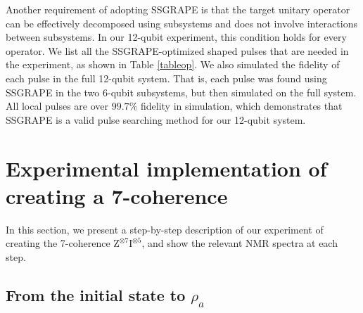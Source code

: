 \documentclass[twocolumn,reprint, amsmath,amssymb,showpacs,superscriptaddress]{revtex4-1}
\begin{document}
Another requirement of adopting SSGRAPE is that the target unitary operator can be effectively decomposed using subsystems and does not involve interactions between subsystems. In our 12-qubit experiment, this condition holds for every operator. We list all the SSGRAPE-optimized shaped pulses that are needed in the experiment, as shown in Table \ref{tableop}. We also simulated the fidelity of each pulse in the full 12-qubit system. That is, each pulse was found using SSGRAPE in the two 6-qubit subsystems, but then simulated on the full system. All local pulses are over $99.7\%$ fidelity in simulation, which demonstrates that SSGRAPE is a valid pulse searching method for our 12-qubit system.



\section{Experimental implementation of creating a 7-coherence}
In this section, we present a step-by-step description of our experiment of creating the 7-coherence $\text{Z}^{\otimes 7}\text{I}^{\otimes 5}$, and show the relevant NMR spectra at each step.



\subsection{From the initial state to $\rho_a$}
\end{document}
